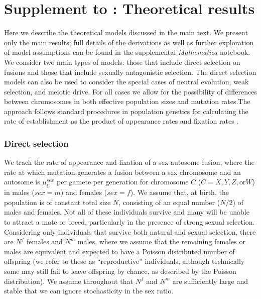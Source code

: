 \chapter{Supplement to : Theoretical results}

Here we describe the theoretical models discussed in the main text. We present only the main results; full details of the derivations as well as further exploration of model assumptions can be found in the supplemental \emph{Mathematica} notebook. We consider two main types of models: those that include direct selection on fusions and those that include sexually antagonistic selection. The direct selection models can also be used to consider the special cases of neutral evolution, weak selection, and meiotic drive. For all cases we allow for the possibility of differences between chromosomes in both effective population sizes and mutation rates.The approach follows standard procedures in population genetics for calculating the rate of establishment as the product of appearance rates and fixation rates \citep[see][]{Charlesworth1987, Charlesworth1994, Kirkpatrick2004}.

\subsection{Direct selection}

We track the rate of appearance and fixation of a sex-autosome fusion, where the rate at which mutation generates a fusion between a sex chromosome and an autosome is $\mu^{sex}_C$ per gamete per generation for chromosome $C$ ($C = X, Y, Z, \text{or} W$) in males ($sex = m$) and females ($sex = f$). We assume that, at birth, the population is of constant total size $N$, consisting of an equal number ($N/\text{2}$) of males and females. Not all of these individuals survive and many will be unable to attract a mate or breed, particularly in the presence of strong sexual selection.  Considering only individuals that survive both natural and sexual selection, there are $N^f$ females and $N^m$ males, where we assume that the remaining females or males are equivalent and expected to have a Poisson distributed number of offspring (we refer to these as ``reproductive'' individuals, although technically some may still fail to leave offspring by chance, as described by the Poisson distribution). We assume throughout that $N^f$ and $N^m$ are sufficiently large and stable that we can ignore stochasticity in the sex ratio. 

